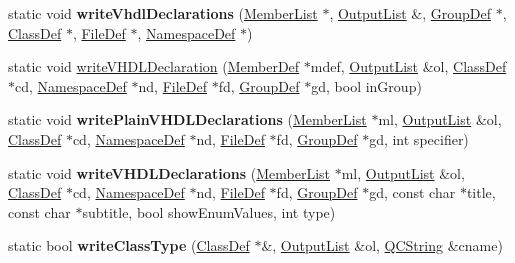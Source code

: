 \begin{DoxyCompactItemize}
\item 
\hypertarget{class_vhdl_doc_gen_a24c93b8f2a3285df8faec4e77a6e270d}{static void {\bfseries write\-Vhdl\-Declarations} (\hyperlink{class_member_list}{Member\-List} $\ast$, \hyperlink{class_output_list}{Output\-List} \&, \hyperlink{class_group_def}{Group\-Def} $\ast$, \hyperlink{class_class_def}{Class\-Def} $\ast$, \hyperlink{class_file_def}{File\-Def} $\ast$, \hyperlink{class_namespace_def}{Namespace\-Def} $\ast$)}\label{class_vhdl_doc_gen_a24c93b8f2a3285df8faec4e77a6e270d}

\item 
static void \hyperlink{class_vhdl_doc_gen_afc7705b9712afec388c1c7a794828c44}{write\-V\-H\-D\-L\-Declaration} (\hyperlink{class_member_def}{Member\-Def} $\ast$mdef, \hyperlink{class_output_list}{Output\-List} \&ol, \hyperlink{class_class_def}{Class\-Def} $\ast$cd, \hyperlink{class_namespace_def}{Namespace\-Def} $\ast$nd, \hyperlink{class_file_def}{File\-Def} $\ast$fd, \hyperlink{class_group_def}{Group\-Def} $\ast$gd, bool in\-Group)
\item 
\hypertarget{class_vhdl_doc_gen_ac8ca424f1bfba21049456061e36dc1fa}{static void {\bfseries write\-Plain\-V\-H\-D\-L\-Declarations} (\hyperlink{class_member_list}{Member\-List} $\ast$ml, \hyperlink{class_output_list}{Output\-List} \&ol, \hyperlink{class_class_def}{Class\-Def} $\ast$cd, \hyperlink{class_namespace_def}{Namespace\-Def} $\ast$nd, \hyperlink{class_file_def}{File\-Def} $\ast$fd, \hyperlink{class_group_def}{Group\-Def} $\ast$gd, int specifier)}\label{class_vhdl_doc_gen_ac8ca424f1bfba21049456061e36dc1fa}

\item 
\hypertarget{class_vhdl_doc_gen_ab69d5b2cc0c3de587b893116db3970a2}{static void {\bfseries write\-V\-H\-D\-L\-Declarations} (\hyperlink{class_member_list}{Member\-List} $\ast$ml, \hyperlink{class_output_list}{Output\-List} \&ol, \hyperlink{class_class_def}{Class\-Def} $\ast$cd, \hyperlink{class_namespace_def}{Namespace\-Def} $\ast$nd, \hyperlink{class_file_def}{File\-Def} $\ast$fd, \hyperlink{class_group_def}{Group\-Def} $\ast$gd, const char $\ast$title, const char $\ast$subtitle, bool show\-Enum\-Values, int type)}\label{class_vhdl_doc_gen_ab69d5b2cc0c3de587b893116db3970a2}

\item 
\hypertarget{class_vhdl_doc_gen_a47abdf935ef97abba9f0a41a2d289b25}{static bool {\bfseries write\-Class\-Type} (\hyperlink{class_class_def}{Class\-Def} $\ast$\&, \hyperlink{class_output_list}{Output\-List} \&ol, \hyperlink{class_q_c_string}{Q\-C\-String} \&cname)}\label{class_vhdl_doc_gen_a47abdf935ef97abba9f0a41a2d289b25}


\end{DoxyCompactItemize}
